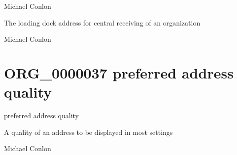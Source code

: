 \documentclass[letterpaper,10pt,english]{sphinxmanual}
\begin{document}
\begin{sphinxShadowBox}

\sphinxAtStartPar
Michael Conlon 
\end{sphinxShadowBox}

\begin{sphinxShadowBox}

\sphinxAtStartPar
The loading dock address for central receiving of an organization
\end{sphinxShadowBox}

\begin{sphinxShadowBox}

\sphinxAtStartPar
Michael Conlon 
\end{sphinxShadowBox}
\begin{quote}
\label{\detokenize{doc-ORG_0000037:org-0000037}}\label{\detokenize{doc-ORG_0000037:preferred-address-quality}}\label{\detokenize{doc-ORG_0000037:org-0000037}}
\ignorespaces \end{quote}


\section{ORG\_0000037 \sphinxhyphen{} preferred address quality}
\label{\detokenize{doc-ORG_0000037:org-0000037-preferred-address-quality}}\label{\detokenize{doc-ORG_0000037:index-0}}\label{\detokenize{doc-ORG_0000037::doc}}
\begin{sphinxShadowBox}

\sphinxAtStartPar
preferred address quality
\end{sphinxShadowBox}

\begin{sphinxShadowBox}

\sphinxAtStartPar
A quality of an address to be displayed in most settings
\end{sphinxShadowBox}

\begin{sphinxShadowBox}

\sphinxAtStartPar
Michael Conlon 
\end{sphinxShadowBox}
\end{document}

